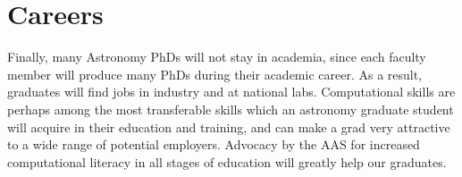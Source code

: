 \documentclass[11pt]{article}
\begin{document}

\section{Careers}

Finally, many Astronomy PhDs will not stay in academia, since each
faculty member will produce many PhDs during their academic career.
As a result, graduates will find jobs in industry and at national
labs. Computational skills are perhaps among the most transferable
skills which an astronomy graduate student will acquire in their
education and training, and can make a grad very attractive to a wide
range of potential employers.  Advocacy by the AAS for increased
computational literacy in all stages of education will greatly help
our graduates.
\end{document}
